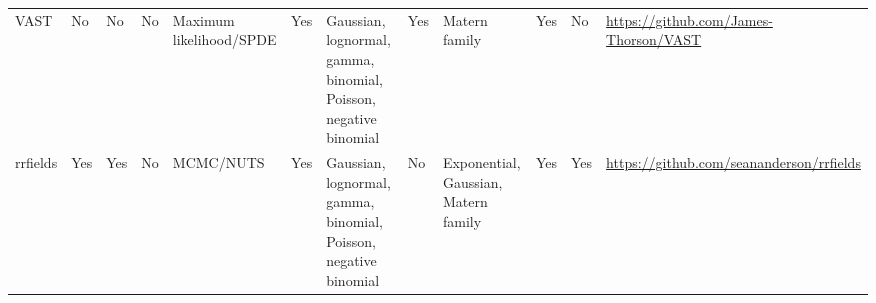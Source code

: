 \documentclass[12pt,english]{article}
\begin{document}
\begin{landscape}
\begin{table}
\begin{minipage}{\textwidth}
\begin{scriptsize}
\begin{tabular}{llllL{2cm}lL{2.4cm}lL{2.0cm}llL{2.0cm}}
        VAST     & No             & No      & No      & Maximum likelihood/SPDE     & Yes        & Gaussian, lognormal, gamma, binomial, Poisson, negative binomial  & Yes      & Matern family                                     & Yes                   & No        & \url{https://github.com/James-Thorson/VAST}                      \\
        rrfields & Yes            & Yes     & No      & MCMC/NUTS                   & Yes        & Gaussian, lognormal, gamma, binomial, Poisson, negative binomial  & No       & Exponential, Gaussian, Matern family              & Yes                   & Yes       & \url{https://github.com/seananderson/rrfields}                  \\
        \bottomrule
      \end{tabular}
    \end{scriptsize}
  \end{minipage}
  \end{table}
\end{landscape}
\end{document}
